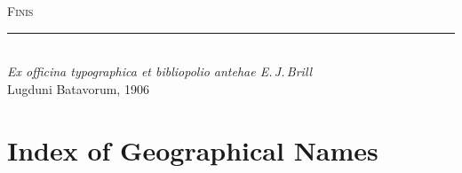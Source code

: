 \documentclass[11pt,a4paper]{article}
\newcommand{\shortline}{\noindent\rule{0.5\textwidth}{0.4pt}\par}
\begin{document}
\clearpage








\thispagestyle{empty}

\vspace*{5cm}



\begin{center}

{\large\textsc{Finis}}\\[1cm]



\shortline\\[1cm]



{\small\textit{Ex officina typographica et bibliopolio antehae E.\,J.\,Brill}}\\[0.5cm]

{\small Lugduni Batavorum, 1906}



\end{center}



\clearpage








\section*{Index of Geographical Names}

\end{document}
